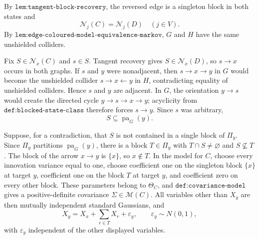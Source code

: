 By \(\texttt{lem:tangent-block-recovery}\), the reversed edge is a singleton block in both states and
\[
 \mathcal N_j(C)=\mathcal N_j(D)\quad(j\in V).
\]
By \(\texttt{lem:edge-coloured-model-equivalence-markov}\), \(G\) and \(H\) have the same unshielded colliders.

Fix \(S\in\mathcal N_x(C)\) and \(s\in S\). Tangent recovery gives \(S\in\mathcal N_x(D)\), so \(s\to x\) occurs in both graphs. If \(s\) and \(y\) were nonadjacent, then \(s\to x\to y\) in \(G\) would become the unshielded collider \(s\to x\leftarrow y\) in \(H\), contradicting equality of unshielded colliders. Hence \(s\) and \(y\) are adjacent. In \(G\), the orientation \(y\to s\) would create the directed cycle \(y\to s\to x\to y\); acyclicity from \(\texttt{def:blocked-state-class}\) therefore forces \(s\to y\). Since \(s\) was arbitrary,
\[
 S\subseteq\operatorname{pa}_G(y).
\]

Suppose, for a contradiction, that \(S\) is not contained in a single block of \(\Pi_y\). Since \(\Pi_y\) partitions \(\operatorname{pa}_G(y)\), there is a block \(T\in\Pi_y\) with \(T\cap S\neq\varnothing\) and \(S\nsubseteq T\). The block of the arrow \(x\to y\) is \(\{x\}\), so \(x\notin T\). In the model for \(C\), choose every innovation variance equal to one, choose coefficient one on the singleton block \(\{x\}\) at target \(y\), coefficient one on the block \(T\) at target \(y\), and coefficient zero on every other block. These parameters belong to \(\Theta_C\), and \(\texttt{def:covariance-model}\) gives a positive-definite covariance \(\Sigma\in\mathcal M(C)\). All variables other than \(X_y\) are then mutually independent standard Gaussians, and
\[
 X_y=X_x+\sum_{r\in T}X_r+\varepsilon_y,
 \qquad \varepsilon_y\sim N(0,1),
\]
with \(\varepsilon_y\) independent of the other displayed variables.


